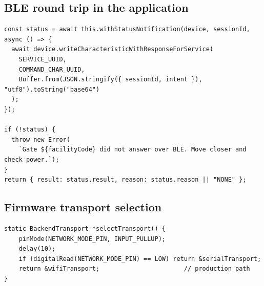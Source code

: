 \subsection{BLE round trip in the application}

\begin{lstlisting}[style=typescript,caption={Subscribe before write, filter by session
id, and give the whole round trip a fifteen-second budget.},label={lst:ble}]
const status = await this.withStatusNotification(device, sessionId, async () => {
  await device.writeCharacteristicWithResponseForService(
    SERVICE_UUID,
    COMMAND_CHAR_UUID,
    Buffer.from(JSON.stringify({ sessionId, intent }), "utf8").toString("base64")
  );
});

if (!status) {
  throw new Error(
    `Gate ${facilityCode} did not answer over BLE. Move closer and check power.`);
}
return { result: status.result, reason: status.reason || "NONE" };
\end{lstlisting}

\subsection{Firmware transport selection}

\begin{lstlisting}[style=cpp,caption={One pin decides the transport at boot; all gate
logic above it is shared.},label={lst:firmware-select}]
static BackendTransport *selectTransport() {
    pinMode(NETWORK_MODE_PIN, INPUT_PULLUP);
    delay(10);
    if (digitalRead(NETWORK_MODE_PIN) == LOW) return &serialTransport;
    return &wifiTransport;                       // production path
}
\end{lstlisting}
